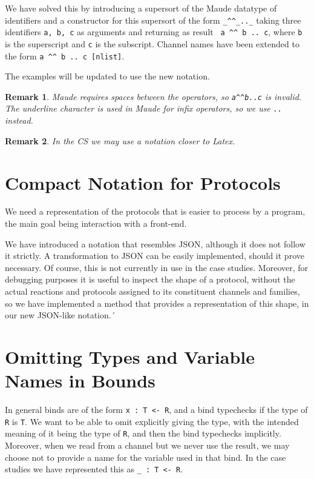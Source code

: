 \documentclass{article}
\newtheorem{remark}{Remark}
\begin{document}
We have solved this by introducing a supersort of the Maude datatype of identifiers and a constructor for this supersort of the form
\verb+_^^_.._+ taking three identifiers \verb+a, b, c+ as arguments and 
returning as result \verb+ a ^^ b .. c+, where \verb+b+ is the superscript
and \verb+c+ is the subscript. Channel names have been extended to the form
\verb+a ^^ b .. c [nlist]+.

The examples will be updated to use the new notation.

\begin{remark}
Maude requires spaces between the operators, so \verb+a^^b..c+ is invalid. 
The underline character is used in Maude for infix operators, so we use \verb+..+ instead.
\end{remark}

\begin{remark}
In the CS we may use a notation closer to Latex.
\end{remark}

\section{Compact Notation for Protocols}

We need a representation of the protocols that is easier to process by a program, the main goal being interaction with a front-end.

We have introduced a notation that resembles JSON, although it does not follow it strictly. A transformation to JSON can be easily implemented, should it prove necessary. Of course, this is not currently in use in the case studies. Moreover, for debugging purposes it is useful to inspect the
shape of a protocol, without the actual reactions and protocols assigned to its constituent channels and families, so we have implemented a method that provides a representation of this shape, in our new JSON-like notation.´

\section{Omitting Types and Variable Names in Bounds}

In general binds are of the form \verb+x : T <- R+, and a bind typechecks if the type of \verb+R+ is \verb+T+. We want to be able to omit explicitly giving the type, with the intended meaning of it being the type of \verb+R+, and then the bind typechecks implicitly. Moreover, when we read 
from a channel but we never use the result, we may choose not to provide a 
name for the variable used in that bind. In the case studies we have represented this as \verb+_ : T <- R+.
\end{document}
